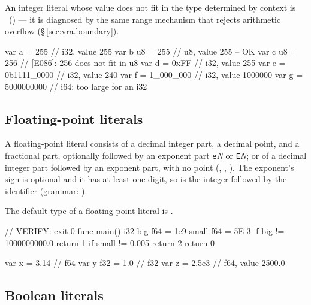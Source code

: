 \begin{constraint}
  An integer literal whose value does not fit in the type determined by
  context is \illformed{}~() --- it is diagnosed by the same
  range mechanism that rejects arithmetic overflow (\S\,\ref{sec:vra.boundary}).
\end{constraint}

\begin{example}
\begin{laincode}
var a = 255         // i32, value 255
var b u8 = 255      // u8, value 255 -- OK
var c u8 = 256      // [E086]: 256 does not fit in u8
var d = 0xFF        // i32, value 255
var e = 0b1111_0000 // i32, value 240
var f = 1_000_000   // i32, value 1000000
var g = 5000000000  // i64: too large for an i32
\end{laincode}
\end{example}

\subsection{Floating-point literals}
\label{sec:lex.literals.float}

\pnum
A floating-point literal consists of a decimal integer part, a decimal
point, and a fractional part, optionally followed by an exponent part
\texttt{e}\textit{N} or \texttt{E}\textit{N}; or of a decimal integer part followed by an
exponent part, with no point (, , ).  The exponent's sign is
optional and it has at least one digit, so  is the integer  followed by the
identifier  (grammar: ).

\pnum
The default type of a floating-point literal is .

\begin{laincode}
// VERIFY: exit 0
func main() i32 {
    big f64 = 1e9
    small f64 = 5E-3
    if big != 1000000000.0 { return 1 }
    if small != 0.005 { return 2 }
    return 0
}
\end{laincode}

\begin{example}
\begin{laincode}
var x = 3.14      // f64
var y f32 = 1.0   // f32
var z = 2.5e3     // f64, value 2500.0
\end{laincode}
\end{example}

\subsection{Boolean literals}
\label{sec:lex.literals.bool}

